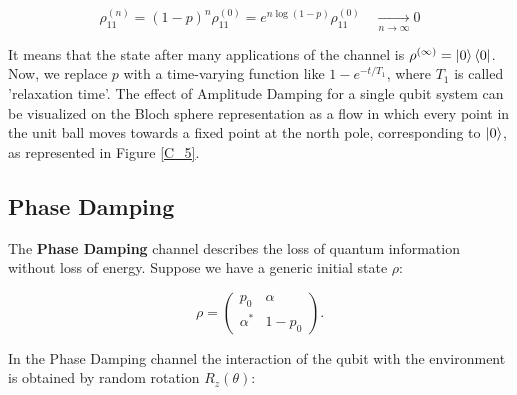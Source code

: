  \begin{equation}
\rho_{11}^{(n)} = (1-p)^n \rho_{11}^{(0)} = e^{n \log(1-p)} \rho_{11}^{(0)} \quad \underset{n \rightarrow \infty}  \longrightarrow 0
\label{29_firstchapter}
 \end{equation}
 
\noindent It means that the state after many applications of the channel is $\rho^{(\infty)}=\left| 0 \right \rangle\left\langle 0 \right |$.
Now, we replace $p$ with a time-varying function like $1-e^{-t/T_1}$,  where $T_1$ is called 'relaxation time'. The effect of Amplitude Damping for a single qubit system can be visualized on the Bloch sphere representation as a flow in which every point in the unit ball moves towards a fixed point at the north pole, corresponding to $\left| 0 \right \rangle$, as represented in Figure \ref{C_5}.






\subsection{Phase Damping} 

The \textbf{Phase Damping} channel describes the loss of quantum information without loss of energy.
Suppose we have a generic initial state $\rho$:

 \begin{equation}
  \rho = \begin{pmatrix} p_0 & \alpha \\  \alpha^* & 1-p_0 \end{pmatrix} .
  \label{30_firstchapter}
 \end{equation}

\noindent In the Phase Damping channel the interaction of the qubit with the environment is obtained by random rotation $R_z(\theta)$:

